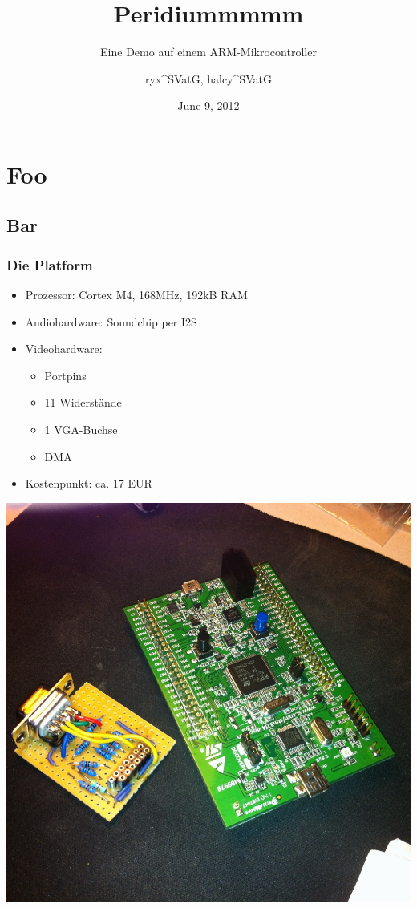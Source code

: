 \documentclass[t,14pt,aspectratio=169]{beamer}
\title{Peridiummmmm}
\subtitle{Eine Demo auf einem ARM-Mikrocontroller}
\author{ryx{\textasciicircum}SVatG, halcy{\textasciicircum}SVatG}
\begin{document}

\date{June 9, 2012}

\begin{frame} %
\titlepage
\end{frame}


\section{Foo}
\subsection{Bar}

\begin{frame} %
\frametitle{Die Platform}

\begin{minipage}{0.6\linewidth}
\begin{itemize}
\item Prozessor: Cortex M4, 168MHz, 192kB RAM
\item Audiohardware: Soundchip per I2S
\item Videohardware: 
\begin{itemize}
\item Portpins
\item 11 Widerstände
\item 1 VGA-Buchse
\item DMA
\end{itemize}
\item Kostenpunkt: ca. 17 EUR
\end{itemize}
\end{minipage}
\begin{minipage}{0.35\linewidth}
\includegraphics[width=\linewidth]{photos/cut}
\end{minipage}
\end{frame}
\end{document}

